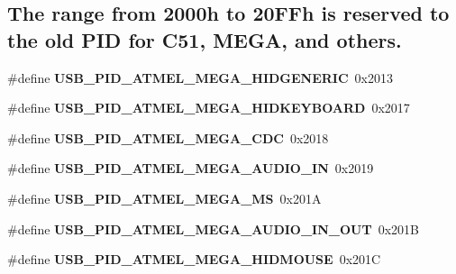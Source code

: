 \subsection*{The range from 2000h to 20\-F\-Fh is reserved to the old P\-I\-D for C51, M\-E\-G\-A, and others.}
\begin{DoxyCompactItemize}
\item 
\hypertarget{group__usb__atmel__ids__group_gae24888f62e3e64cb01fde415bf712964}{\#define {\bfseries U\-S\-B\-\_\-\-P\-I\-D\-\_\-\-A\-T\-M\-E\-L\-\_\-\-M\-E\-G\-A\-\_\-\-H\-I\-D\-G\-E\-N\-E\-R\-I\-C}~0x2013}\label{group__usb__atmel__ids__group_gae24888f62e3e64cb01fde415bf712964}

\item 
\hypertarget{group__usb__atmel__ids__group_ga6ffa25d6fd7b99faffb10811165a5cbc}{\#define {\bfseries U\-S\-B\-\_\-\-P\-I\-D\-\_\-\-A\-T\-M\-E\-L\-\_\-\-M\-E\-G\-A\-\_\-\-H\-I\-D\-K\-E\-Y\-B\-O\-A\-R\-D}~0x2017}\label{group__usb__atmel__ids__group_ga6ffa25d6fd7b99faffb10811165a5cbc}

\item 
\hypertarget{group__usb__atmel__ids__group_ga433805be6787a174140c0b140cd3b19c}{\#define {\bfseries U\-S\-B\-\_\-\-P\-I\-D\-\_\-\-A\-T\-M\-E\-L\-\_\-\-M\-E\-G\-A\-\_\-\-C\-D\-C}~0x2018}\label{group__usb__atmel__ids__group_ga433805be6787a174140c0b140cd3b19c}

\item 
\hypertarget{group__usb__atmel__ids__group_ga691d09a8572063b5408687f3c0812397}{\#define {\bfseries U\-S\-B\-\_\-\-P\-I\-D\-\_\-\-A\-T\-M\-E\-L\-\_\-\-M\-E\-G\-A\-\_\-\-A\-U\-D\-I\-O\-\_\-\-I\-N}~0x2019}\label{group__usb__atmel__ids__group_ga691d09a8572063b5408687f3c0812397}

\item 
\hypertarget{group__usb__atmel__ids__group_gac3fdf47be4d8a57253ea554c086890a2}{\#define {\bfseries U\-S\-B\-\_\-\-P\-I\-D\-\_\-\-A\-T\-M\-E\-L\-\_\-\-M\-E\-G\-A\-\_\-\-M\-S}~0x201\-A}\label{group__usb__atmel__ids__group_gac3fdf47be4d8a57253ea554c086890a2}

\item 
\hypertarget{group__usb__atmel__ids__group_ga3e31683337b6ffe668a82e4b0665033a}{\#define {\bfseries U\-S\-B\-\_\-\-P\-I\-D\-\_\-\-A\-T\-M\-E\-L\-\_\-\-M\-E\-G\-A\-\_\-\-A\-U\-D\-I\-O\-\_\-\-I\-N\-\_\-\-O\-U\-T}~0x201\-B}\label{group__usb__atmel__ids__group_ga3e31683337b6ffe668a82e4b0665033a}

\item 
\hypertarget{group__usb__atmel__ids__group_ga262ddbd401f791b4e05bd9d0691b5524}{\#define {\bfseries U\-S\-B\-\_\-\-P\-I\-D\-\_\-\-A\-T\-M\-E\-L\-\_\-\-M\-E\-G\-A\-\_\-\-H\-I\-D\-M\-O\-U\-S\-E}~0x201\-C}\label{group__usb__atmel__ids__group_ga262ddbd401f791b4e05bd9d0691b5524}


\end{DoxyCompactItemize}
